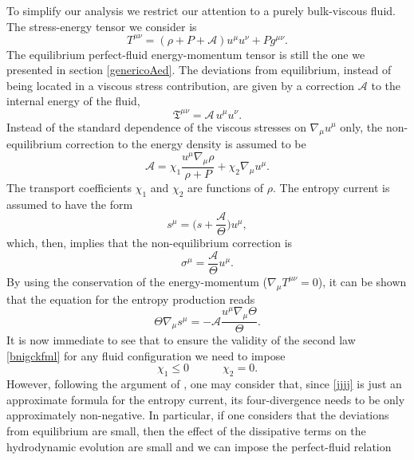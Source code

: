 \documentclass[a4paper, amsfonts, amssymb, amsmath, reprint, showkeys, nofootinbib, twoside]{revtex4-1}
\newcommand{\spc}{\quad \quad \quad}
\begin{document}
To simplify our analysis we restrict our attention to a purely bulk-viscous fluid. The stress-energy tensor we consider is
\begin{equation}
T^{\mu \nu} = (\rho +P +\mathcal{A})u^\mu u^\nu + P g^{\mu \nu}.
\end{equation}
The equilibrium perfect-fluid energy-momentum tensor is still the one we presented in section \ref{genericoAed}. The deviations from equilibrium, instead of being located in a viscous stress contribution, are given by a correction $\mathcal{A}$ to the internal energy of the fluid,
\begin{equation}
\mathfrak{T}^{\mu \nu} = \mathcal{A} \, u^\mu u^\nu.
\end{equation}
Instead of the standard dependence of the viscous stresses on $\nabla_\mu u^\mu$ only, the non-equilibrium correction to the energy density is assumed to be 
\begin{equation}\label{brakiut}
\mathcal{A} = \chi_1 \dfrac{u^\mu \nabla_\mu \rho}{\rho + P} +\chi_2 \nabla_\mu u^\mu.
\end{equation}
The transport coefficients $\chi_1$ and $\chi_2$ are functions of $\rho$. 
The entropy current is assumed to have the form
\begin{equation}\label{jjjj}
s^\mu = \bigg( s+ \dfrac{\mathcal{A}}{\Theta}  \bigg) u^\mu,
\end{equation}
which, then, implies that the non-equilibrium correction is
\begin{equation}
\sigma^\mu =  \dfrac{\mathcal{A}}{\Theta}  u^\mu.
\end{equation}
By using the conservation of the energy-momentum ($\nabla_\mu T^{\mu \nu}=0$), it can be shown that the equation for the entropy production reads
\begin{equation}\label{procucimale}
\Theta \nabla_\mu s^\mu = -\mathcal{A} \dfrac{u^\mu \nabla_\mu \Theta}{\Theta} .
\end{equation}
It is now immediate to see that to ensure the validity of the second law \eqref{bnigckfml} for any fluid configuration we need to impose
\begin{equation}\label{nonloro}
\chi_1 \leq 0  \spc \chi_2 =0. 
\end{equation}
However, following the argument of \citet{Kovtun2019}, one may consider that, since \eqref{jjjj} is just an approximate formula for the entropy current, its four-divergence needs to be only approximately non-negative. In particular, if one considers that the deviations from equilibrium are small, then the effect of the dissipative terms on the hydrodynamic evolution are small and we can impose the perfect-fluid relation
\end{document}

